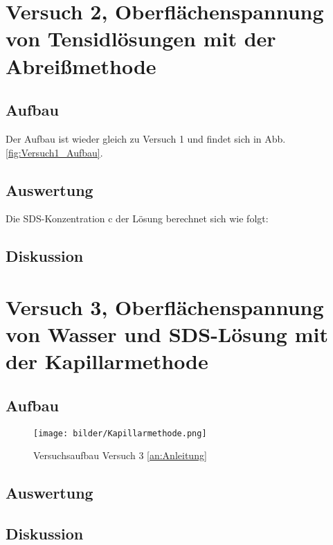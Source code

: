     \section{Versuch 2, Oberflächenspannung von Tensidlösungen mit der Abreißmethode}

        \subsection{Aufbau}
            Der Aufbau ist wieder gleich zu Versuch 1 und findet sich in Abb. \ref{fig:Versuch1_Aufbau}. 

        \subsection{Auswertung}
            Die SDS-Konzentration $\mathrm{c}$ der Lösung berechnet sich wie folgt:

        
        \subsection{Diskussion}

    \section{Versuch 3, Oberflächenspannung von Wasser und SDS-Lösung mit der Kapillarmethode}

        \subsection{Aufbau}

            \begin{figure}[H]
                \centering
                \texttt{[image: bilder/Kapillarmethode.png]}
                \caption{Versuchsaufbau Versuch 3 \ref{an:Anleitung}}
                \label{fig:Versuch3_Aufbau}
            \end{figure}

        \subsection{Auswertung}
        
        \subsection{Diskussion}
